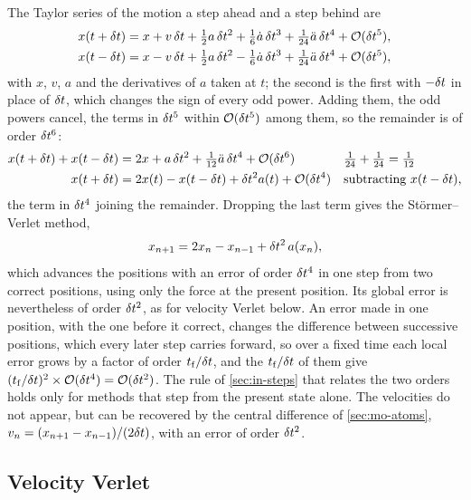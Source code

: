 The Taylor series of the motion a step ahead and a step behind are
\begin{align*}
   x(t + \delta t) &= x + v\,\delta t + \tfrac12 a\,\delta t^2 + \tfrac16\dot{a}\,\delta t^3
   + \tfrac1{24}\ddot{a}\,\delta t^4 + \mathcal{O}(\delta t^5) ,\\
   x(t - \delta t) &= x - v\,\delta t + \tfrac12 a\,\delta t^2 - \tfrac16\dot{a}\,\delta t^3
   + \tfrac1{24}\ddot{a}\,\delta t^4 + \mathcal{O}(\delta t^5) ,
\end{align*}
with $x$, $v$, $a$ and the derivatives of $a$ taken at $t$; the second is
the first with $-\delta t$ in place of $\delta t$, which changes the sign of every
odd power. Adding them, the odd powers cancel, the terms in $\delta t^5$
within $\mathcal{O}(\delta t^5)$ among them, so the remainder is of order $\delta t^6$:
\begin{align*}
   x(t + \delta t) + x(t - \delta t) &= 2x + a\,\delta t^2 + \tfrac1{12}\ddot{a}\,\delta t^4
   + \mathcal{O}(\delta t^6)
   && \text{$\tfrac1{24} + \tfrac1{24} = \tfrac1{12}$}\\
   x(t + \delta t) &= 2x(t) - x(t - \delta t) + \delta t^2a(t) + \mathcal{O}(\delta t^4)
   && \text{subtracting $x(t - \delta t)$,}
\end{align*}
the term in $\delta t^4$ joining the remainder.
Dropping the last term gives the Störmer--Verlet method,
\begin{equation}
   x_{n+1} = 2x_n - x_{n-1} + \delta t^2\,a(x_n) ,
   \label{eq:in-stormer}
\end{equation}
which advances the positions with an error of order $\delta t^4$ in one step
from two correct positions, using only the force at the present position.
Its global error is nevertheless of order $\delta t^2$, as for velocity Verlet
below. An error made in one position, with the one before it correct,
changes the difference between successive positions, which every later
step carries forward, so over a fixed time each local error grows by a
factor of order $t_{\mathrm f}/\delta t$, and the $t_{\mathrm f}/\delta t$ of them
give $(t_{\mathrm f}/\delta t)^2\times\mathcal{O}(\delta t^4) = \mathcal{O}(\delta t^2)$. The rule
of \cref{sec:in-steps} that relates the two orders holds only for methods
that step from the present state alone. The velocities do not appear, but
can be recovered by the central difference of \cref{sec:mo-atoms}, $v_n =
(x_{n+1} - x_{n-1})/(2\delta t)$, with an error of order $\delta t^2$.

\subsection*{Velocity Verlet}

